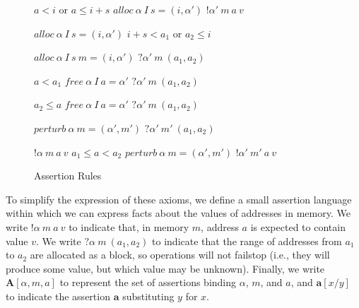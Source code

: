 \documentclass{article}
\begin{document}
\begin{figure}
\begin{minipage}{0.33\textwidth}
                      {\(a < i\) or \(a \leq i+s\)}
                      {\(\mathit{alloc} ~ \alpha ~ I ~ s = (i, \alpha')\)}
                      {\(!\alpha' ~ m ~ a ~ v\)}
  \end{minipage}
  \begin{minipage}{0.33\textwidth}
               {\(\mathit{alloc} ~ \alpha ~ I ~ s = (i, \alpha')\)}
               {\(i+s < a_1\) or \(a_2 \leq i\)}
  \end{minipage}
  \begin{minipage}{0.33\textwidth}
               {\(\mathit{alloc} ~ \alpha ~ I ~ s ~ m = (i, \alpha')\)}
               {\(?\alpha' ~ m ~ (a_1,a_2)\)}
  \end{minipage}
  \begin{minipage}{0.33\textwidth}
                      {\(a < a_1\)}
                      {\(\mathit{free} ~ \alpha ~ I ~ a = \alpha'\)}
                      {\(?\alpha' ~ m ~ (a_1,a_2)\)}
  \end{minipage}
  \begin{minipage}{0.33\textwidth}
                      {\(a_2 \leq a\)}
                      {\(\mathit{free} ~ \alpha ~ I ~ a = \alpha'\)}
                      {\(?\alpha' ~ m ~ (a_1,a_2)\)}
  \end{minipage}
  \begin{minipage}{0.33\textwidth}
               {\(\mathit{perturb} ~ \alpha ~ m = (\alpha', m')\)}
               {\(?\alpha' ~ m' ~ (a_1,a_2)\)}
  \end{minipage}
  \begin{minipage}{0.33\textwidth}
                        {\(!\alpha ~ m ~ a ~ v\)}
                        {\(a_1 \leq a < a_2\)}
                        {\(\mathit{perturb} ~ \alpha ~ m = (\alpha', m')\)}
                        {\(!\alpha' ~ m' ~ a ~ v\)}
  \end{minipage}

  \caption{Assertion Rules}
  \label{fig:asserts}
\end{figure}

To simplify the expression of these axioms, we define a small assertion language within
which we can express facts about the values of addresses in memory. We write
\(!\alpha ~ m ~ a ~ v\) to indicate that, in memory \(m\), address \(a\) is expected
to contain value \(v\). We write \(?\alpha ~ m ~ (a_1,a_2)\) to indicate that the range
of addresses from \(a_1\) to \(a_2\) are allocated as a block, so operations will not failstop
(i.e., they will produce some value, but which value may be unknown).
Finally, we write \(\mathbf{A}[\alpha,m,a]\) to represent the set of assertions binding \(\alpha\),
\(m\), and \(a\), and \(\mathbf{a}[x/y]\) to indicate the assertion \(\mathbf{a}\) substituting
\(y\) for \(x\).
\end{document}
